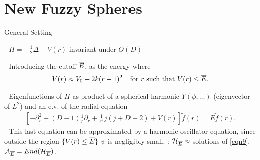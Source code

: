 \section{New Fuzzy Spheres}

\begin{frame}{General Setting} %
    
    - $H = - \frac{1}{2} \Delta + V(r)$ invariant under $O(D)$
    
    - Introducing the cutoff $\overline{E}$, as the energy where
    \begin{align}
        \label{eqn5}
            V(r) \approx V_0 + 2k(r-1)^2 && \text{for $r$ such that $V(r) \leq  \overline{E}$}.
    \end{align}
    
    - Eigenfunctions of $H$ as product of a spherical harmonic $Y(\phi, \dots)$ (eigenvector of $L^2$) and an e.v. of the radial equation 
    \begin{align}
        \label{eqn9}
        \left[-\partial_r^2 - (D-1) \frac{1}{r} \partial_r + \frac{1}{r^2} j(j+D-2) + V(r)\right] \tilde f(r) = E \tilde f(r).
    \end{align}
    - This last equation can be approximated by a harmonic oscillator equation, since outside the region $\{V(r) \leq \overline{E}\}$ $\psi$ is negligibly small.
    : $\mathcal H_{\overline{E}} \approx $ solutions of \eqref{eqn9}, $\mathcal A_{\overline{E}} = End(\mathcal H_{\overline{E}})$.
        
    
    
    
    
\end{frame}



